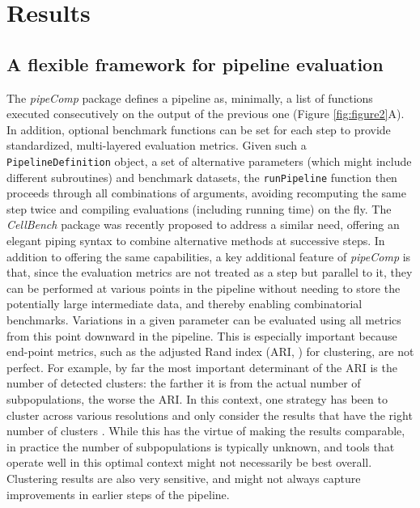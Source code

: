 \documentclass{bmcart}
\begin{document}
\section*{Results}

\subsection*{A flexible framework for pipeline evaluation}

The \textit{pipeComp} package defines a pipeline as, minimally, a list of functions executed consecutively on the output of the previous one (Figure \ref{fig:figure2}A). In addition, optional benchmark functions can be set for each step to provide standardized, multi-layered evaluation metrics. Given such a \texttt{PipelineDefinition} object, a set of alternative parameters (which might include different subroutines) and benchmark datasets, the \texttt{runPipeline} function then proceeds through all combinations of arguments, avoiding recomputing the same step twice and compiling evaluations (including running time) on the fly. The \textit{CellBench} package was recently proposed to address a similar need\citep{su_cellbench}, offering an elegant piping syntax to combine alternative methods at successive steps. In addition to offering the same capabilities, a key additional feature of \textit{pipeComp} is that, since the evaluation metrics are not treated as a step but parallel to it, they can be performed at various points in the pipeline without needing to store the potentially large intermediate data, and thereby enabling combinatorial benchmarks. Variations in a given parameter can be evaluated using all metrics from this point downward in the pipeline. This is especially important because end-point metrics, such as the adjusted Rand index (ARI, \citep{HubertARI1985}) for clustering, are not perfect. For example, by far the most important determinant of the ARI is the number of detected clusters: the farther it is from the actual number of subpopulations, the worse the ARI. In this context, one strategy has been to cluster across various resolutions and only consider the results that have the right number of clusters \citep{duoClustering2018}. While this has the virtue of making the results comparable, in practice the number of subpopulations is typically unknown, and tools that operate well in this optimal context might not necessarily be best overall. Clustering results are also very sensitive, and might not always capture improvements in earlier steps of the pipeline.
\end{document}
